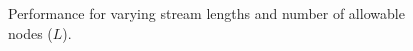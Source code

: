\begin{figure}[t] 
	\begin{center}
		\caption{Performance for varying stream lengths and number of allowable nodes ($L$).}
		\label{fig:varying_stream_length}
	\end{center} 
\end{figure} 



